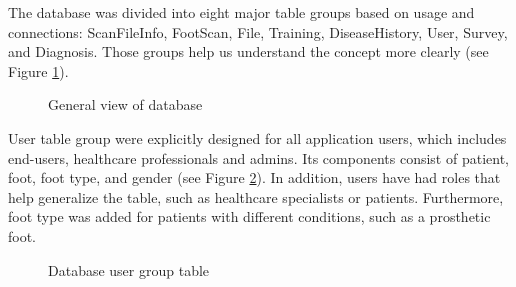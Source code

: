 The database was divided into eight major table groups based on usage and connections: ScanFileInfo, FootScan, File, Training, DiseaseHistory, User, Survey, and Diagnosis. Those groups help us understand the concept more clearly (see Figure \ref{fig:DatabaseGeneralView}). 

\begin{figure}[htbp]
\centering
{}
\caption{General view of database}
\label{fig:DatabaseGeneralView}
\end{figure}

User table group were explicitly designed for all application users, which includes end-users, healthcare professionals and admins. Its components consist of patient, foot, foot type, and gender (see Figure \ref{fig:DatabaseUser}). In addition, users have had roles that help generalize the table, such as healthcare specialists or patients. Furthermore, foot type was added for patients with different conditions, such as a prosthetic foot.

\begin{figure}[htbp]
\centering
{}
\caption{Database user group table}
\label{fig:DatabaseUser}
\end{figure}

